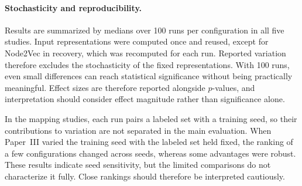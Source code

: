\paragraph{Stochasticity and reproducibility.} Results are summarized by medians over 100 runs per configuration in all five studies. Input representations were computed once and reused, except for Node2Vec in recovery, which was recomputed for each run. Reported variation therefore excludes the stochasticity of the fixed representations. With 100 runs, even small differences can reach statistical significance without being practically meaningful. Effect sizes are therefore reported alongside $p$-values, and interpretation should consider effect magnitude rather than significance alone.

In the mapping studies, each run pairs a labeled set with a training seed, so their contributions to variation are not separated in the main evaluation. When Paper~III varied the training seed with the labeled set held fixed, the ranking of a few configurations changed across seeds, whereas some advantages were robust. These results indicate seed sensitivity, but the limited comparisons do not characterize it fully. Close rankings should therefore be interpreted cautiously.
